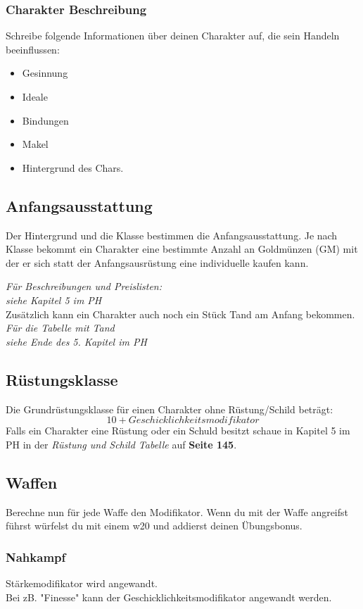 \subsubsection{Charakter Beschreibung}
Schreibe folgende Informationen über deinen Charakter auf, die sein Handeln beeinflussen:
\begin{itemize}
  \item Gesinnung
  \item Ideale
  \item Bindungen
  \item Makel
  \item Hintergrund des Chars.
\end{itemize}

\newpage
\subsection{Anfangsausstattung}
Der Hintergrund und die Klasse bestimmen die Anfangsausstattung. Je nach Klasse bekommt ein Charakter eine bestimmte Anzahl an Goldmünzen (GM) mit der er sich statt der Anfangsausrüstung eine individuelle kaufen kann.

\textit{Für Beschreibungen und Preislisten: \\ siehe Kapitel 5 im PH}\\
Zusätzlich kann ein Charakter auch noch ein Stück Tand am Anfang bekommen. \\
\textit{Für die Tabelle mit Tand\\ siehe Ende des 5. Kapitel im PH}\\

\subsection{Rüstungsklasse}
Die Grundrüstungsklasse für einen Charakter ohne Rüstung/Schild beträgt:
$$10+Geschicklichkeitsmodifikator$$
Falls ein Charakter eine Rüstung oder ein Schuld besitzt schaue in Kapitel 5 im PH in der \textit{Rüstung und Schild Tabelle} auf \textbf{Seite 145}.

\subsection{Waffen}
Berechne nun für jede Waffe den Modifikator. Wenn du mit der Waffe angreifst führst würfelst du mit einem w20 und addierst deinen Übungsbonus.

\subsubsection{Nahkampf}
Stärkemodifikator wird angewandt.\\
Bei zB. "Finesse" kann der Geschicklichkeitsmodifikator angewandt werden.

